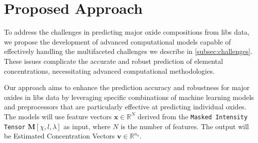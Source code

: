 \section{Proposed Approach}\label{sec:proposed_approach}
To address the challenges in predicting major oxide compositions from \gls{libs} data, we propose the development of advanced computational models capable of effectively handling the multifaceted challenges we describe in \ref{subsec:challenges}.
These issues complicate the accurate and robust prediction of elemental concentrations, necessitating advanced computational methodologies.

Our approach aims to enhance the prediction accuracy and robustness for major oxides in \gls{libs} data by leveraging specific combinations of machine learning models and preprocessors that are particularly effective at predicting individual oxides.
The models will use feature vectors $\mathbf{x} \in \mathbb{R}^N$ derived from the \texttt{Masked Intensity Tensor} $\mathbf{M}[\chi, l, \lambda]$ as input, where $N$ is the number of features.
The output will be Estimated Concentration Vectors $\mathbf{v} \in \mathbb{R}^{n_o}$.

